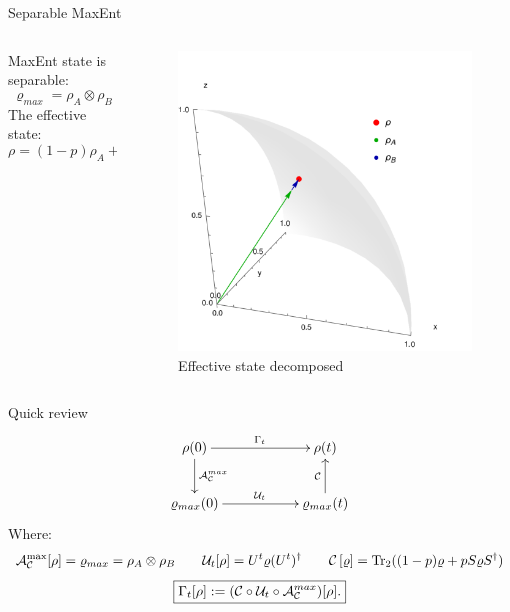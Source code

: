 \begin{frame}{Separable MaxEnt}
    \begin{columns}
        \begin{column}{0.5\textwidth}
            MaxEnt state is separable:
            \begin{equation*}
                \varrho_{max}=\rho_{A}\otimes\rho_{B}
            \end{equation*}
            The effective state:
            \begin{equation*}
                \rho=(1-p)\rho_{A}+p\rho_{B}
            \end{equation*}
        \end{column}
        \begin{column}{0.5\textwidth}
            \begin{figure}[h!]
                \includegraphics[width=0.75\columnwidth]{figures/effective_state_as_sum.png}%
                \caption{Effective state decomposed}
            \end{figure}
        \end{column}
    \end{columns}
\end{frame}

\begin{frame}{Quick review}
    \begin{displaymath}
        \xymatrix{
          {\rho(0)} \ar[rr]^{\Gamma_{t}} \ar[d]^{\mcA^{max}_{\mcC}}
          && {\rho(t)}\\
          {\varrho_{max}(0)} \ar[rr]^{\mcU_{t}}
          && {\varrho_{max}(t)} \ar[u]^{\mcC}
        }
      \end{displaymath}
      Where:
        \begin{equation*}
            \mathcal{A}_{\mathcal{C}}^{\max}[\rho]=\varrho_{max}=\rho_{A}\otimes\rho_{B} \qquad \mathcal{U}_{t}[\rho]=U^{t}\varrho(U^{t})^{\dag} \qquad \mathcal{C}\left[\varrho\right]=\Tr_{2}((1-p)\varrho+pS\varrho S^{\dag})
        \end{equation*}
        \begin{equation*}
            \boxed{\Gamma_t[\rho]:=(\mathcal{C} \circ \mathcal{U}_t \circ \mathcal{A}^{max}_{\mathcal{C}})[\rho].}
        \end{equation*}
\end{frame}